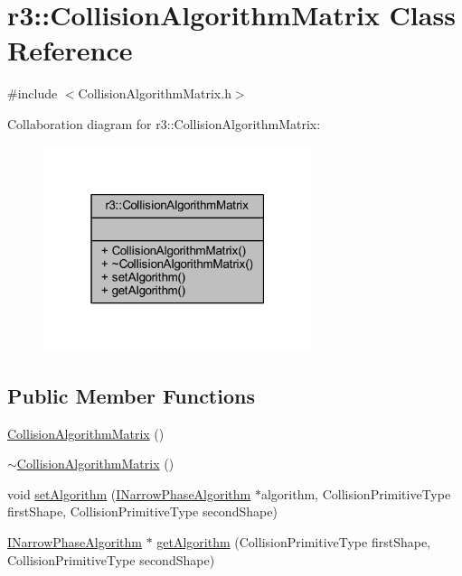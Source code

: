 \hypertarget{classr3_1_1_collision_algorithm_matrix}{}\section{r3\+:\+:Collision\+Algorithm\+Matrix Class Reference}
\label{classr3_1_1_collision_algorithm_matrix}


{\ttfamily \#include $<$Collision\+Algorithm\+Matrix.\+h$>$}



Collaboration diagram for r3\+:\+:Collision\+Algorithm\+Matrix\+:\nopagebreak
\begin{figure}[H]
\begin{center}
\leavevmode
\includegraphics[width=223pt]{classr3_1_1_collision_algorithm_matrix__coll__graph}
\end{center}
\end{figure}
\subsection*{Public Member Functions}
\begin{DoxyCompactItemize}
\item 
\mbox{\hyperlink{classr3_1_1_collision_algorithm_matrix_a97bdad626057f600ae5ffca63eb174b8}{Collision\+Algorithm\+Matrix}} ()
\item 
\mbox{\hyperlink{classr3_1_1_collision_algorithm_matrix_adea2db794d9606ecf24745ad6ac912d8}{$\sim$\+Collision\+Algorithm\+Matrix}} ()
\item 
void \mbox{\hyperlink{classr3_1_1_collision_algorithm_matrix_a6ddf117fbce8a3216b4b4413ccade6d0}{set\+Algorithm}} (\mbox{\hyperlink{classr3_1_1_i_narrow_phase_algorithm}{I\+Narrow\+Phase\+Algorithm}} $\ast$algorithm, Collision\+Primitive\+Type first\+Shape, Collision\+Primitive\+Type second\+Shape)
\item 
\mbox{\hyperlink{classr3_1_1_i_narrow_phase_algorithm}{I\+Narrow\+Phase\+Algorithm}} $\ast$ \mbox{\hyperlink{classr3_1_1_collision_algorithm_matrix_ad40e0f125b95d6bcdb2e8a27c1397e68}{get\+Algorithm}} (Collision\+Primitive\+Type first\+Shape, Collision\+Primitive\+Type second\+Shape)
\end{DoxyCompactItemize}


